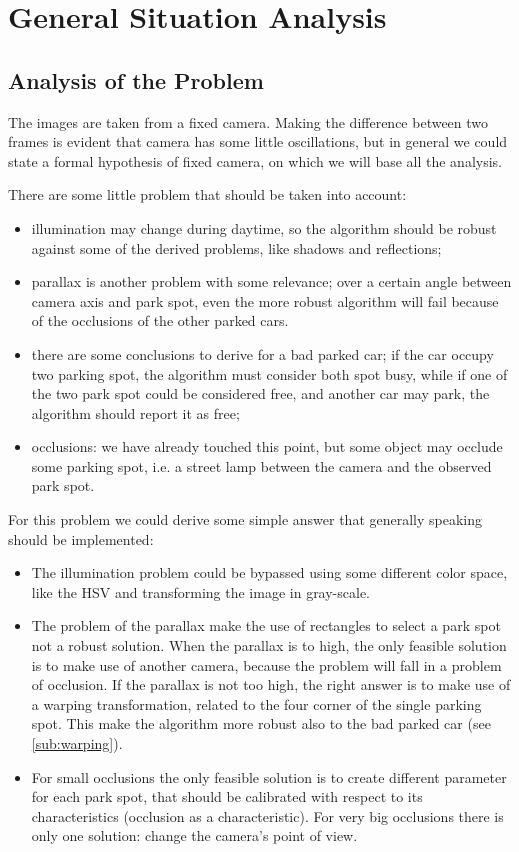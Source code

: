 
\section{General Situation Analysis}

	\subsection{Analysis of the Problem}
	
		The images are taken from a fixed camera. Making the difference between two
		frames is evident that camera has some little oscillations, but in general we
		could state a formal hypothesis of fixed camera, on which we will base all the
		analysis.
		
		There are some little problem that should be taken into account:
		\begin{itemize}
		  \item illumination may change during daytime, so the algorithm should be
		  robust against some of the derived problems, like shadows and reflections;
		  \item parallax is another problem with some relevance; over a certain angle
		  between camera axis and park spot, even the more robust algorithm will fail
		  because of the occlusions of the other parked cars.
		  \item there are some conclusions to derive for a bad parked car; if the car
		  occupy two parking spot, the algorithm must consider both spot busy, while if
		  one of the two park spot could be considered free, and another car may park,
		  the algorithm should report it as free;
		  \item occlusions: we have already touched this point, but some object may
		  occlude some parking spot, i.e. a street lamp between the camera and the
		  observed park spot.
		\end{itemize}
		
		For this problem we could derive some simple answer that generally speaking
		should be implemented:
		\begin{itemize}
		  \item The illumination problem could be bypassed using some different color
		  space, like the HSV and transforming the image in gray-scale.
		  \item The problem of the parallax make the use of rectangles to select a
		  park spot not a robust solution. When the parallax is to high, the only
		  feasible solution is to make use of another camera, because the problem will fall in a
		  problem of occlusion. If the parallax is not too high, the right answer is to
		  make use of a warping transformation, related to the four corner of the
		  single parking spot. This make the algorithm more robust also to the bad
		  parked car (see \ref{sub:warping}).
		  \item For small occlusions the only feasible solution is to create
		  different parameter for each park spot, that should be calibrated with
		  respect to its characteristics (occlusion as a characteristic). For very big
		  occlusions there is only one solution: change the camera's point of view.
		\end{itemize}
	
